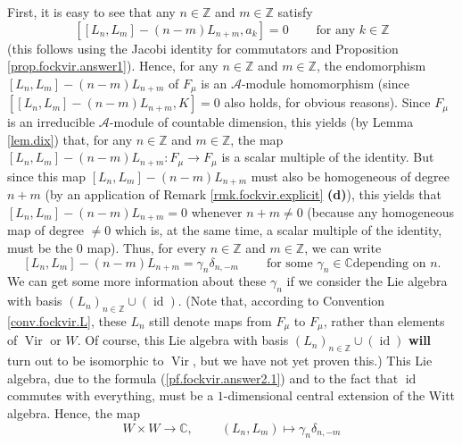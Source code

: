 \documentclass
[numbers=enddot,12pt,final,onecolumn,german,notitlepage]{scrartcl}%
\theoremstyle{definition}
\begin{document}
First, it is easy to see that any $n\in\mathbb{Z}$ and $m\in\mathbb{Z}$
satisfy%
\[
\left[  \left[  L_{n},L_{m}\right]  -\left(  n-m\right)  L_{n+m},a_{k}\right]
=0\ \ \ \ \ \ \ \ \ \ \text{for any }k\in\mathbb{Z}%
\]
(this follows using the Jacobi identity for commutators and Proposition
\ref{prop.fockvir.answer1}). Hence, for any $n\in\mathbb{Z}$ and
$m\in\mathbb{Z}$, the endomorphism $\left[  L_{n},L_{m}\right]  -\left(
n-m\right)  L_{n+m}$ of $F_{\mu}$ is an $\mathcal{A}$-module homomorphism
(since $\left[  \left[  L_{n},L_{m}\right]  -\left(  n-m\right)
L_{n+m},K\right]  =0$ also holds, for obvious reasons). Since $F_{\mu}$ is an
irreducible $\mathcal{A}$-module of countable dimension, this yields (by Lemma
\ref{lem.dix}) that, for any $n\in\mathbb{Z}$ and $m\in\mathbb{Z}$, the map
$\left[  L_{n},L_{m}\right]  -\left(  n-m\right)  L_{n+m}:F_{\mu}\rightarrow
F_{\mu}$ is a scalar multiple of the identity. But since this map $\left[
L_{n},L_{m}\right]  -\left(  n-m\right)  L_{n+m}$ must also be homogeneous of
degree $n+m$ (by an application of Remark \ref{rmk.fockvir.explicit}
\textbf{(d)}), this yields that $\left[  L_{n},L_{m}\right]  -\left(
n-m\right)  L_{n+m}=0$ whenever $n+m\neq0$ (because any homogeneous map of
degree $\neq0$ which is, at the same time, a scalar multiple of the identity,
must be the $0$ map). Thus, for every $n\in\mathbb{Z}$ and $m\in\mathbb{Z}$,
we can write%
\begin{equation}
\left[  L_{n},L_{m}\right]  -\left(  n-m\right)  L_{n+m}=\gamma_{n}%
\delta_{n,-m}\ \ \ \ \ \ \ \ \ \ \text{for some }\gamma_{n}\in\mathbb{C}\text{
depending on }n\text{.} \label{pf.fockvir.answer2.1}%
\end{equation}
We can get some more information about these $\gamma_{n}$ if we consider the
Lie algebra with basis $\left(  L_{n}\right)  _{n\in\mathbb{Z}}\cup\left(
\operatorname*{id}\right)  $. (Note that, according to Convention
\ref{conv.fockvir.L}, these $L_{n}$ still denote maps from $F_{\mu}$ to
$F_{\mu}$, rather than elements of $\operatorname*{Vir}$ or $W$. Of course,
this Lie algebra with basis $\left(  L_{n}\right)  _{n\in\mathbb{Z}}%
\cup\left(  \operatorname*{id}\right)  $ \textbf{will} turn out to be
isomorphic to $\operatorname*{Vir}$, but we have not yet proven this.) This
Lie algebra, due to the formula (\ref{pf.fockvir.answer2.1}) and to the fact
that $\operatorname*{id}$ commutes with everything, must be a $1$-dimensional
central extension of the Witt algebra. Hence, the map
\[
W\times W\rightarrow\mathbb{C},\ \ \ \ \ \ \ \ \ \ \left(  L_{n},L_{m}\right)
\mapsto\gamma_{n}\delta_{n,-m}%
\]
\end{document}
